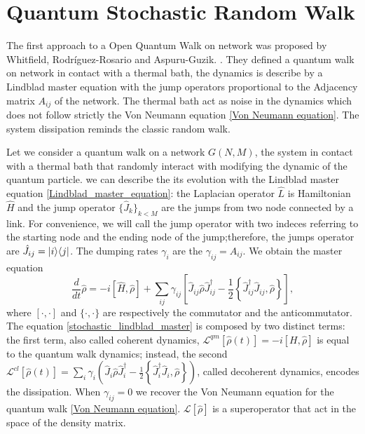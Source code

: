 \section{Quantum Stochastic Random Walk}\label{C_Quantum Stochastic Walk}

The first approach to a Open Quantum Walk on network was proposed by Whitfield, Rodr\'iguez-Rosario and Aspuru-Guzik. \cite{QSW}. They defined a quantum walk on network in contact with a thermal bath, the dynamics is describe by a Lindblad master equation with the jump operators proportional to the Adjacency matrix $A_{ij}$ of the network. The thermal bath act as noise in the dynamics which does not follow strictly the Von Neumann equation \eqref{Von Neumann equation}. The system dissipation reminds the classic random walk.

Let we consider a quantum walk on a network $G(N,M)$, the system in contact with a thermal bath that randomly interact with modifying the dynamic of the quantum particle. we can describe the its evolution with the Lindblad master equation \eqref{Lindblad_master_equation}: the Laplacian operator $\hat L$ is Hamiltonian $\hat H$ and the jump operator $\{\hat J_k\}_{k<M}$ are the jumps from two node connected by a link. For convenience, we will call the jump operator with two indeces referring to the starting node and the ending node of the jump;therefore, the jumps operator are $\hat J_{ij} = \lvert i\rangle\langle j\rvert$. The dumping rates $\gamma_i$ are the $\gamma_{ij} =A_{ij}$.
We obtain the master equation
\begin{equation}\label{stochastic_lindblad_master}
    \frac{d}{dt}\hat \rho = -i\left[\hat H,\hat\rho\right] + \sum_{ij}\gamma_{ij}\left[\hat J_{ij} \hat\rho\hat J_{ij}^\dagger -\frac{1}{2} \left\{ \hat J_{ij}^\dagger \hat J_{ij}, \hat\rho\right\}\right],
\end{equation}
where $[\cdot,\cdot]$ and $\{\cdot,\cdot\}$ are respectively the commutator and the anticommutator.
The equation \eqref{stochastic_lindblad_master} is composed by two distinct terms: the first term, also called coherent dynamics,
$\mathcal{L}^{qm}\left[\hat\rho(t)\right] = -i\left[H,\hat\rho\right]$ is equal to the quantum walk dynamics; instead, the second $\mathcal{L}^{cl}\left[\hat\rho(t)\right] = \sum_i \gamma_i \left(\hat J_i \hat\rho \hat J^\dagger_i - \frac{1}{2}\left\{ \hat J^\dagger_i\hat J_i, \hat\rho\right\} \right)$, called decoherent dynamics, encodes the dissipation. 
When $\gamma_{ij} = 0$ we recover the Von Neumann equation for the quantum walk \eqref{Von Neumann equation}. 
$\mathcal{L}\left[\hat\rho\right]$ is a superoperator that act in the space of the density matrix.

